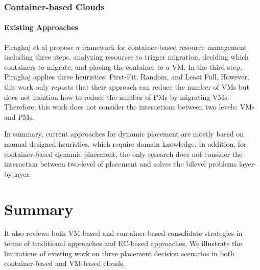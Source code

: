 \subsubsection{Container-based Clouds}
\paragraph{Existing Approaches}
Piraghaj et al \cite{Piraghaj:2015dv} propose a framework for container-based resource management including three steps, analyzing resources to trigger migration, deciding which containers to migrate, and placing the container to a VM. In the third step, Piraghaj applies three heuristics: First-Fit, Random, and Least Full. However, this work only reports that their approach can reduce the number of VMs but does not mention how to reduce the number of PMs by migrating VMs. Therefore, this work does not consider the interactions between two levels: VMs and PMs. 


\vspace{5mm}

In summary, current approaches for dynamic placement are mostly based on manual designed heuristics, which require domain knowledge. In addition, for container-based dynamic placement, the only research does not consider the interaction between two-level of placement and solves the bilevel problems layer-by-layer.

\section{Summary}

 It also reviews both VM-based and container-based consolidate strategies in terms of traditional approaches and EC-based approaches. We illustrate the limitations of existing work on three placement decision scenarios in both container-based and VM-based clouds. 

